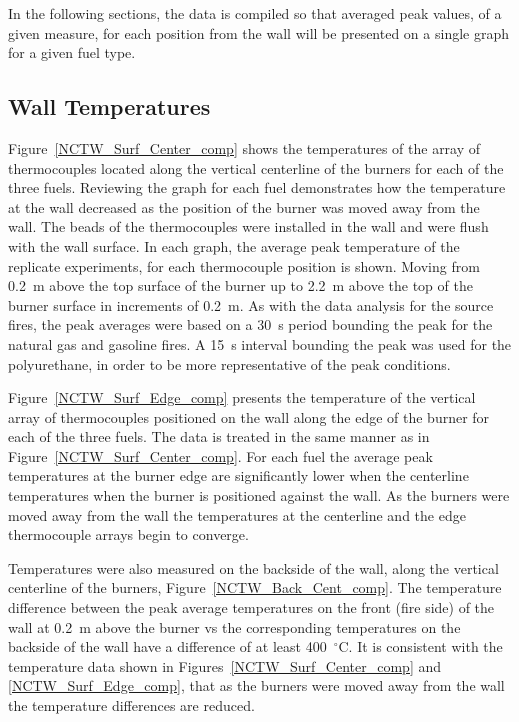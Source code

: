 \documentclass[twoside]{uocthesis}
\begin{document}
{In the following sections, the data is compiled so that averaged peak values, of a given measure, for each position from the wall will be presented on a single graph for a given fuel type.

\subsection{Wall Temperatures}

Figure~\ref{NCTW_Surf_Center_comp} shows the temperatures of the array of thermocouples located along the vertical centerline of the burners for each of the three fuels. Reviewing the graph for each fuel demonstrates how the temperature at the wall decreased as the position of the burner was moved away from the wall. The beads of the thermocouples were installed in the wall and were flush with the wall surface. In each graph, the average peak temperature of the replicate experiments, for each thermocouple position is shown. Moving from 0.2~m above the top surface of the burner up to 2.2~m above the top of the burner surface in increments of 0.2~m. As with the data analysis for the source fires, the peak averages were based on a 30~s period bounding the peak for the natural gas and gasoline fires.  A 15~s interval bounding the peak was used for the polyurethane, in order to be more representative of the peak conditions.

Figure~\ref{NCTW_Surf_Edge_comp} presents the temperature of the vertical array of thermocouples positioned on the wall along the edge of the burner for each of the three fuels.  The data is treated in the same manner as in Figure~\ref{NCTW_Surf_Center_comp}.  For each fuel the average peak temperatures at the burner edge are significantly lower when the centerline temperatures when the burner is positioned against the wall.  As the burners were moved away from the wall the temperatures at the centerline and the edge thermocouple arrays begin to converge.

Temperatures were also measured on the backside of the wall, along the vertical centerline of the burners, Figure~\ref{NCTW_Back_Cent_comp}. The temperature difference between the peak average temperatures on the front (fire side) of the wall at 0.2~m above the burner vs the corresponding temperatures on the backside of the wall have a difference of at least 400~$^\circ$C.  It is consistent with the temperature data shown in Figures~\ref{NCTW_Surf_Center_comp} and \ref{NCTW_Surf_Edge_comp}, that as the burners were moved away from the wall the temperature differences are reduced.

}
\end{document}
